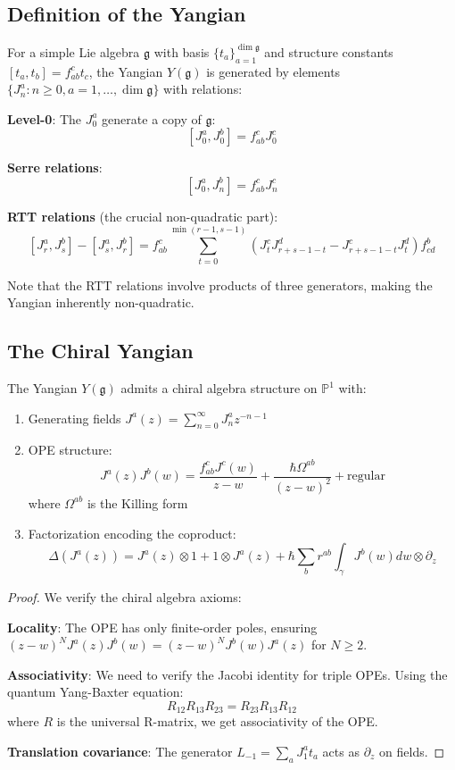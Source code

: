 \subsection{Definition of the Yangian}

\begin{definition}
For a simple Lie algebra $\mathfrak{g}$ with basis $\{t_a\}_{a=1}^{\dim \mathfrak{g}}$ and structure constants $[t_a, t_b] = f_{ab}^c t_c$, the Yangian $Y(\mathfrak{g})$ is generated by elements $\{J_n^a : n \geq 0, a = 1, \ldots, \dim \mathfrak{g}\}$ with relations:

\textbf{Level-0}: The $J_0^a$ generate a copy of $\mathfrak{g}$:
\[
[J_0^a, J_0^b] = f_{ab}^c J_0^c
\]

\textbf{Serre relations}: 
\[
[J_0^a, J_n^b] = f_{ab}^c J_n^c
\]

\textbf{RTT relations} (the crucial non-quadratic part):
\[
[J_r^a, J_s^b] - [J_s^a, J_r^b] = f_{ab}^c \sum_{t=0}^{\min(r-1,s-1)} (J_t^c J_{r+s-1-t}^d - J_{r+s-1-t}^c J_t^d) f_{cd}^b
\]
\end{definition}

Note that the RTT relations involve products of three generators, making the Yangian inherently non-quadratic.

\subsection{The Chiral Yangian}

\begin{theorem}
The Yangian $Y(\mathfrak{g})$ admits a chiral algebra structure on $\mathbb{P}^1$ with:
\begin{enumerate}
\item Generating fields $J^a(z) = \sum_{n=0}^{\infty} J_n^a z^{-n-1}$
\item OPE structure:
\[
J^a(z)J^b(w) = \frac{f_{ab}^c J^c(w)}{z-w} + \frac{\hbar \Omega^{ab}}{(z-w)^2} + \text{regular}
\]
where $\Omega^{ab}$ is the Killing form
\item Factorization encoding the coproduct:
\[
\Delta(J^a(z)) = J^a(z) \otimes 1 + 1 \otimes J^a(z) + \hbar \sum_b r^{ab} \int_\gamma J^b(w) dw \otimes \partial_z
\]
\end{enumerate}
\end{theorem}

\begin{proof}
We verify the chiral algebra axioms:

\textbf{Locality}: The OPE has only finite-order poles, ensuring $(z-w)^N J^a(z)J^b(w) = (z-w)^N J^b(w)J^a(z)$ for $N \geq 2$.

\textbf{Associativity}: We need to verify the Jacobi identity for triple OPEs. Using the quantum Yang-Baxter equation:
\[
R_{12}R_{13}R_{23} = R_{23}R_{13}R_{12}
\]
where $R$ is the universal R-matrix, we get associativity of the OPE.

\textbf{Translation covariance}: The generator $L_{-1} = \sum_a J_1^a t_a$ acts as $\partial_z$ on fields. \qedhere
\end{proof}


